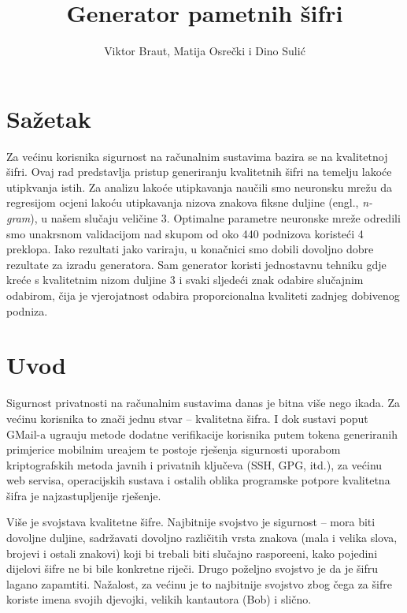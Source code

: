 \documentclass[a4paper,twocolumn,dvipdfm]{article}
\begin{document}
\title{Generator pametnih \v{s}ifri}
\author{Viktor Braut, Matija Osre\v{c}ki i Dino Suli\'c}
\maketitle

\section*{Sa\v{z}etak}

Za ve\'cinu korisnika sigurnost na ra\v{c}unalnim sustavima bazira se na
kvalitetnoj \v{s}ifri. Ovaj rad predstavlja pristup generiranju kvalitetnih
\v{s}ifri na temelju lako\'ce utipkvanja istih. Za analizu lako\'ce utipkavanja
nau\v{c}ili smo neuronsku mre\v{z}u da regresijom ocjeni lako\'cu utipkavanja
nizova znakova fiksne duljine (engl., \emph{n-gram}), u na\v{s}em slu\v{c}aju
veli\v{c}ine 3. Optimalne parametre neuronske mre\v{z}e odredili smo unakrsnom
validacijom nad skupom od oko 440 podnizova koriste\'ci 4 preklopa. Iako
rezultati jako variraju, u kona\v{c}nici smo dobili dovoljno dobre rezultate za
izradu generatora. Sam generator koristi jednostavnu tehniku gdje kre\'ce s
kvalitetnim nizom duljine 3 i svaki sljede\'ci znak odabire slu\v{c}ajnim
odabirom, \v{c}ija je vjerojatnost odabira proporcionalna kvaliteti zadnjeg
dobivenog podniza.

\section{Uvod}

Sigurnost privatnosti na ra\v{c}unalnim sustavima danas je bitna vi\v{s}e nego
ikada. Za ve\'cinu korisnika to zna\v{c}i jednu stvar -- kvalitetna \v{s}ifra.
I dok sustavi poput GMail-a ugra\dj uju metode dodatne verifikacije korisnika
putem tokena generiranih primjerice mobilnim ure\dj ajem te postoje
rje\v{s}enja sigurnosti uporabom kriptografskih metoda javnih i privatnih
klju\v{c}eva (SSH, GPG, itd.), za ve\'cinu web servisa, operacijskih sustava i
ostalih oblika programske potpore kvalitetna \v{s}ifra je najzastupljenije
rje\v{s}enje. 

Vi\v{s}e je svojstava kvalitetne \v{s}ifre. Najbitnije svojstvo je sigurnost --
mora biti dovoljne duljine, sadr\v{z}avati dovoljno razli\v{c}itih vrsta
znakova (mala i velika slova, brojevi i ostali znakovi) koji bi trebali biti
slu\v{c}ajno raspore\dj eni, kako pojedini dijelovi \v{s}ifre ne bi bile
konkretne rije\v{c}i. Drugo po\v{z}eljno svojstvo je da je \v{s}ifru lagano
zapamtiti. Na\v{z}alost, za ve\'cinu je to najbitnije svojstvo zbog \v{c}ega za
\v{s}ifre koriste imena svojih djevojki, velikih kantautora (Bob) i sli\v{c}no.
\end{document}
